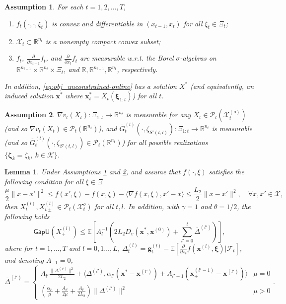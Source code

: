 \documentclass[10pt,a4paper]{amsart}
\newtheorem{assumption}{Assumption}
\newtheorem{lemma}{Lemma}
\newcommand{\E}{\mathbb{E}}
\newcommand{\R}{\mathbb{R}}
\newcommand{\bx}{\boldsymbol{\xi}}
\newcommand{\bz}{\boldsymbol{\zeta}}
\newcommand{\gapu}{\mathsf{GapU}}
\newcommand{\mb}{\mathbf}
\newcommand{\mc}{\mathcal}
\begin{document}
\begin{assumption}\label{assu:convex}
    For each $t=1,2,\ldots,T$, 
    \begin{enumerate}
        \item $f_t(\cdot,\cdot,\xi_t)$ is convex and differentiable in $(x_{t-1},x_t)$ for all $\xi_t\in \Xi_t$; 
        \item $\mc X_t\subset \R^{n_t}$ is a nonempty compact convex subset;
        \item $f_t$, $\frac{\partial }{\partial x_{t-1}}f_t$, and $\frac{\partial }{\partial x_{t}}f_t$ are measurable w.r.t. the Borel $\sigma$-algebras on $\R^{n_{t-1}}\times \R^{n_t}\times\Xi_t$, and $\R, \R^{n_{t-1}},\R^{n_t}$, respectively.
    \end{enumerate}
    In addition, \eqref{eq:obj_unconstrained-online} has a solution $X^*$ (and equivalently, an induced solution $\mb x^* $ where $\mb x_t^* = X_t(\bx_{1:t})$) for all $t$. 
\end{assumption}

\begin{assumption}\label{assumption:measurable}
     $\nabla v_t(X_t):\Xi_{1:t}\to \R^{n_t}$ is measurable for any $X_t\in \mc P_t(\mc X_t^{(o)})$ (and so $\nabla v_t(X_t)\in \mc P_t(\R^{n_t})$), and $\overline{G}_t^{(l)}(\cdot,\zeta_{S'(t,l)}):\Xi_{1:t}\to \R^{n_t}$ is measurable (and so $\overline{G}_t^{(l)}(\cdot,\zeta_{S'(t,l)})\in  \mc P_t(\R^{n_t})$) for all possible realizations $\{\bz_k = \zeta_{k},~k\in \mc K\}$.
\end{assumption}

\begin{lemma}\label{lm:acc-inexact-multi-stage}
Under Assumptions \ref{assu:convex} and \ref{assumption:measurable}, and assume that $f(\cdot,\xi)$ satisfies the following condition for all $\xi\in \Xi$
\begin{equation}\label{eq:condition-convex-smooth-f}
    \frac{\mu}{2}\|x - x'\|^2\leq f(x',\xi) - f(x,\xi) - \langle \nabla f(x,\xi),x'-x\rangle \leq \frac{L_2}{2}\|x - x'\|^2,\quad \forall x,x'\in  \mc X,
\end{equation}
 then $X_t^{(l)}, X_{t\pm}^{(l)}\in \mc P_t(\mc X_t^o)$ for all $t,l$. In addition, with $\gamma = 1$ and $\theta = 1/2$, the following holds
\begin{displaymath}
\gapu(X_{+}^{(l)}) \leq \E[A_l^{-1}(2L_2D_v(\mb x^*,\mb x^{(0)}) + \sum_{l'=0}^{l}\overline{\Delta}^{(l')})],
\end{displaymath}
where for $t = 1,\ldots,T$ and $l = 0,1\ldots,L$, $\Delta^{(l)}_t = \mb g_t^{(l)} - \E[\frac{\partial}{\partial x_t} f(\mb x^{(l)},\bx)|\mc F_t]$, and denoting $A_{-1} = 0$,
\begin{displaymath}
    \overline{\Delta}^{(l')} =\begin{cases}A_{l'}\frac{\|\Delta^{(l')}\|^2}{2 L_2} +  \langle \Delta^{(l')},\alpha_{l'}(\mb x^*-\mb x^{(l')}) + A_{l'-1}(\mb x_+^{(l'-1)}-\mb x^{(l')})\rangle&\mu=0\\
(\frac{\alpha_{l'}}{\mu} + \frac{A_{l'}}{2\mu}+\frac{A_{l'}}{2L_2})\|\Delta^{(l')}\|^2 &\mu >0
\end{cases}.
\end{displaymath}

\end{lemma}
\end{document}
